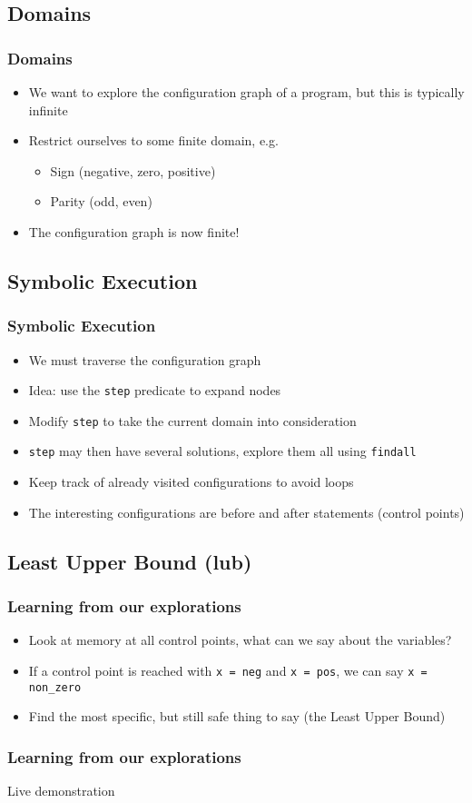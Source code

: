 \documentclass[]{beamer}
\begin{document}
\subsection{Domains}

\begin{frame}
\frametitle{Domains}
\begin{itemize}
\item We want to explore the configuration graph of a program, but this is typically infinite
\item Restrict ourselves to some finite domain, e.g.
	\begin{itemize}
	\item Sign (negative, zero, positive)
	\item Parity (odd, even)
	\end{itemize}
\item The configuration graph is now finite!
\end{itemize}
\end{frame}

\subsection{Symbolic Execution}

\begin{frame}[fragile]
	\frametitle{Symbolic Execution}
	\begin{itemize}
		\item We must traverse the configuration graph
		\item Idea: use the \verb|step| predicate to expand nodes
		\item Modify \verb|step| to take the current domain into consideration
		\item \verb|step| may then have several solutions, explore them all using \verb|findall|
		\item Keep track of already visited configurations to avoid loops
		\item The interesting configurations are before and after statements (control points) 
	\end{itemize}
\end{frame}

\subsection{Least Upper Bound (lub)}
\begin{frame}[fragile]
	\frametitle{Learning from our explorations}
	\begin{itemize}
		\item Look at memory at all control points, what can we say about the variables?
		\item If a control point is reached with \verb|x = neg| and \verb|x = pos|, we can say \verb|x = non_zero|
		\item Find the most specific, but still safe thing to say (the Least Upper Bound)
	\end{itemize}
\end{frame}

\begin{frame}[fragile]
	\frametitle{Learning from our explorations}
	\centering
	Live demonstration
\end{frame}
\end{document}
